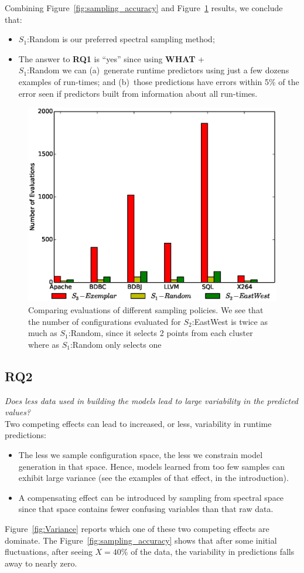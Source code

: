\documentclass{sig-alternative}
\newcommand{\bi}{\begin{itemize}}%
\newcommand{\ei}{\end{itemize}}
\newcommand{\fig}[1]{Figure~\ref{fig:#1}}
\newcommand{\what}{{\bf WHAT }}
\begin{document}
\begin{myshadowbox}
Combining \fig{sampling_accuracy} and \fig{Evaluations} results, we conclude that:
\bi
\item
$S_1$:Random is our preferred spectral sampling method;
\item
The answer to {\bf RQ1} is ``yes'' since using \what +\\$S_1$:Random we can (a)~generate runtime predictors
using just a few dozens examples of run-times; and (b)~those predictions have errors
within 5\% of the error seen if predictors built from information about all run-times.
\ei
\end{myshadowbox}

\begin{figure}[!t]
\includegraphics[width=0.9\linewidth]{Figures/evaluation_graph.eps}
\caption{ Comparing evaluations of different sampling policies. We see that the number of configurations evaluated for $S_2$:EastWest is twice as much as $S_1$:Random, since it selects 2 points from each cluster where as  $S_1$:Random only selects one }\label{fig:Evaluations}
\end{figure}


\subsection{RQ2}

{\em
Does less data used in building the models lead to large variability in the predicted values?}\\

Two competing effects can lead to increased, or less,  variability  in 
runtime predictions:
\bi
\item
The less we sample configuration space,
the less we constrain model generation in that space. Hence, models learned
from too few samples can exhibit large variance (see the examples of that effect,
in the introduction). 
\item
A compensating effect can be introduced by sampling from spectral space
since that space contains fewer confusing variables than that raw data.
\ei
\fig{Variance} reports which one of these two competing effects are dominate. 
The \fig{sampling_accuracy} shows that after some initial fluctuations,
after seeing $X=40$\% of the data, the variability in predictions falls away to nearly zero.
\end{document}
